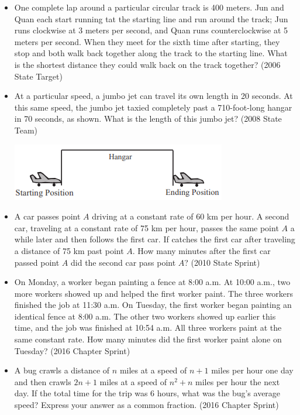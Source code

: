 \documentclass{article}
\begin{document}
\begin{itemize}
\item One complete lap around a particular circular track is 400 meters. Jun and Quan each start running tat the starting line and run around the track; Jun runs clockwise at 3 meters per second, and Quan runs counterclockwise at 5 meters per second. When they meet for the sixth time after starting, they stop and both walk back together along the track to the starting line. What is the shortest distance they could walk back on the track together?  (2006 State Target)

\item At a particular speed, a jumbo jet can travel its own length in 20 seconds. At this same speed, the jumbo jet taxied completely past a 710-foot-long hangar in 70 seconds, as shown. What is the length of this jumbo jet? (2008 State Team)

\centerline{\includegraphics{200832.png}}

\item A car passes point $A$ driving at a constant rate of 60 km per hour. A second car, traveling at a constant rate of 75 km per hour, passes the same point $A$ a while later and then follows the first car. If catches the first car after traveling a distance of 75 km past point $A$. How many minutes after the first car passed point $A$ did the second car pass point $A$? (2010 State Sprint)

\item On Monday, a worker began painting a fence at 8:00 a.m. At 10:00 a.m., two more workers showed up and helped the first worker paint. The three workers finished the job at 11:30 a.m. On Tuesday, the first worker began painting an identical fence at 8:00 a.m. The other two workers showed up earlier this time, and the job was finished at 10:54 a.m. All three workers paint at the same constant rate. How many minutes did the first worker paint alone on Tuesday? (2016 Chapter Sprint)

\item A bug crawls a distance of $n$ miles at a speed of $n+1$ miles per hour one day and then crawls $2n+1$ miles at a speed of $n^2+n$ miles per hour the next day. If the total time for the trip was 6 hours, what was the bug's average speed? Express your answer as a common fraction. (2016 Chapter Sprint)



\end{itemize}
\end{document}
